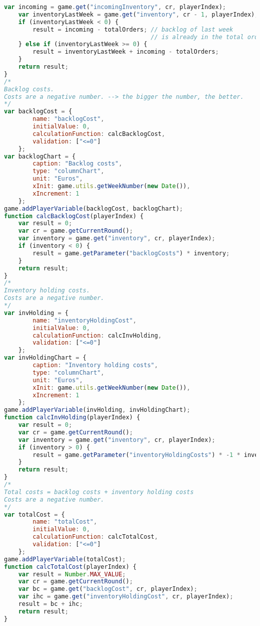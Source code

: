 \begin{lstlisting}[language=Javascript, caption=Game code of the beergame, label=lst:beergame]
    var incoming = game.get("incomingInventory", cr, playerIndex);
    var inventoryLastWeek = game.get("inventory", cr - 1, playerIndex);
    if (inventoryLastWeek < 0) {
        result = incoming - totalOrders; // backlog of last week
                                         // is already in the total orders
    } else if (inventoryLastWeek >= 0) {
        result = inventoryLastWeek + incoming - totalOrders;
    }
    return result;
}
/*
Backlog costs.
Costs are a negative number. --> the bigger the number, the better.
*/
var backlogCost = {
        name: "backlogCost",
        initialValue: 0,
        calculationFunction: calcBacklogCost,
        validation: ["<=0"]
    };
var backlogChart = {
        caption: "Backlog costs",
        type: "columnChart",
        unit: "Euros",
        xInit: game.utils.getWeekNumber(new Date()),
        xIncrement: 1
    };
game.addPlayerVariable(backlogCost, backlogChart);
function calcBacklogCost(playerIndex) {
    var result = 0;
    var cr = game.getCurrentRound();
    var inventory = game.get("inventory", cr, playerIndex);
    if (inventory < 0) {
        result = game.getParameter("backlogCosts") * inventory;
    }
    return result;
}
/*
Inventory holding costs.
Costs are a negative number.
*/
var invHolding = {
        name: "inventoryHoldingCost",
        initialValue: 0,
        calculationFunction: calcInvHolding,
        validation: ["<=0"]
    };
var invHoldingChart = {
        caption: "Inventory holding costs",
        type: "columnChart",
        unit: "Euros",
        xInit: game.utils.getWeekNumber(new Date()),
        xIncrement: 1
    };
game.addPlayerVariable(invHolding, invHoldingChart);
function calcInvHolding(playerIndex) {
    var result = 0;
    var cr = game.getCurrentRound();
    var inventory = game.get("inventory", cr, playerIndex);
    if (inventory > 0) {
        result = game.getParameter("inventoryHoldingCosts") * -1 * inventory;
    }
    return result;
}
/*
Total costs = backlog costs + inventory holding costs
Costs are a negative number.
*/
var totalCost = {
        name: "totalCost",
        initialValue: 0,
        calculationFunction: calcTotalCost,
        validation: ["<=0"]
    };
game.addPlayerVariable(totalCost);
function calcTotalCost(playerIndex) {
    var result = Number.MAX_VALUE;
    var cr = game.getCurrentRound();
    var bc = game.get("backlogCost", cr, playerIndex);
    var ihc = game.get("inventoryHoldingCost", cr, playerIndex);
    result = bc + ihc;
    return result;
}
\end{lstlisting}